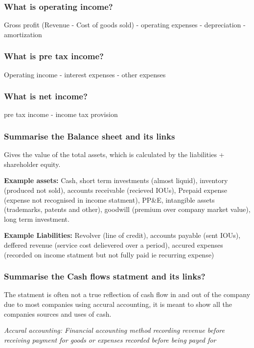 \documentclass[11pt]{scrartcl} %
\begin{document}
\subsubsection{What is operating income?}

Gross profit (Revenue - Cost of goods sold) - operating expenses - depreciation - amortization

\subsubsection{What is pre tax income?}

Operating income - interest expenses - other expenses

\subsubsection{What is net income?}

pre tax income - income tax provision

\subsubsection{Summarise the Balance sheet and its links}

Gives the value of the total assets, which is calculated by the liabilities + shareholder equity.

\textbf{Example assets:} Cash, short term investments (almost liquid), inventory (produced not sold), accounts receivable (recieved IOUs), Prepaid expense (expense not recognised in income statment), 
PP\&E, intangible assets (trademarks, patents and other), goodwill (premium over company market value), long term investment.

\textbf{Example Liabilities:} Revolver (line of credit), accounts payable (sent IOUs), deffered revenue (service cost delievered over a period), accured expenses (recorded on income 
statment but not fully paid ie recurring expense)

\subsubsection{Summarise the Cash flows statment and its links?}

The statment is often not a true reflection of cash flow in and out of the company due to most companies using accural accounting, it is meant to show all the companies sources and uses of cash.

\textit{Accural accounting: Financial accounting method recording revenue before receiving payment for goods or expenses recorded before being payed for}\\
\end{document}
